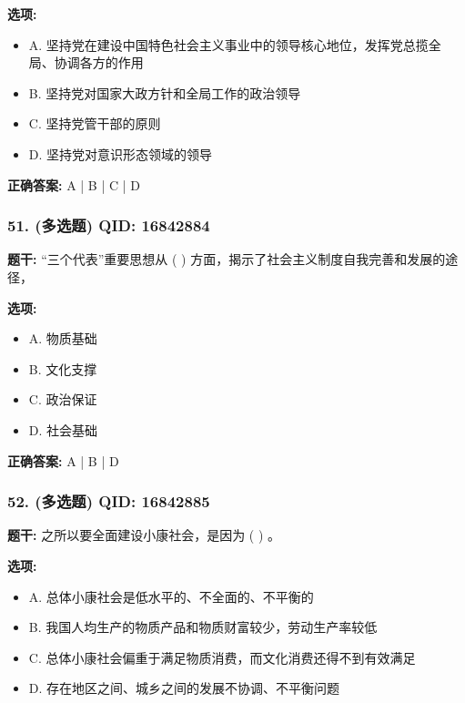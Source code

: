 \documentclass[12pt,UTF8]{ctexart}
\begin{document}
\textbf{选项:}
\begin{itemize}[leftmargin=*]

  \item A. 坚持党在建设中国特色社会主义事业中的领导核心地位，发挥党总揽全局、协调各方的作用

  \item B. 坚持党对国家大政方针和全局工作的政治领导

  \item C. 坚持党管干部的原则

  \item D. 坚持党对意识形态领域的领导

\end{itemize}

\textbf{正确答案:}
A | B | C | D

\vspace{0.3em}\hrulefill\vspace{0.7em}

\subsubsection*{51. (多选题) \small QID: 16842884}

\textbf{题干:}
“三个代表”重要思想从 ( ) 方面，揭示了社会主义制度自我完善和发展的途径，

\textbf{选项:}
\begin{itemize}[leftmargin=*]

  \item A. 物质基础

  \item B. 文化支撑

  \item C. 政治保证

  \item D. 社会基础

\end{itemize}

\textbf{正确答案:}
A | B | D

\vspace{0.3em}\hrulefill\vspace{0.7em}

\subsubsection*{52. (多选题) \small QID: 16842885}

\textbf{题干:}
之所以要全面建设小康社会，是因为 ( ) 。

\textbf{选项:}
\begin{itemize}[leftmargin=*]

  \item A. 总体小康社会是低水平的、不全面的、不平衡的

  \item B. 我国人均生产的物质产品和物质财富较少，劳动生产率较低

  \item C. 总体小康社会偏重于满足物质消费，而文化消费还得不到有效满足

  \item D. 存在地区之间、城乡之间的发展不协调、不平衡问题

\end{itemize}
\end{document}
